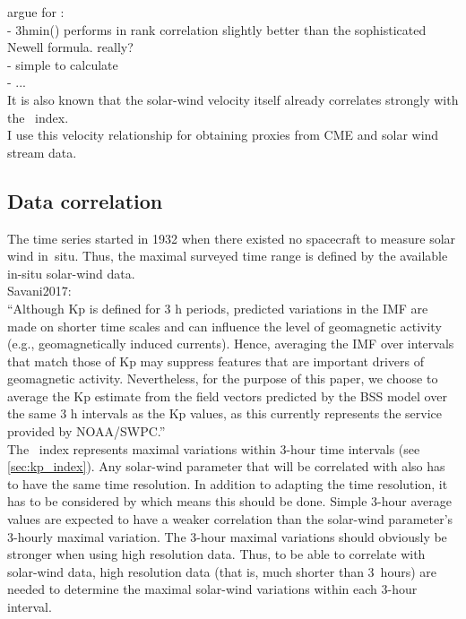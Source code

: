 argue for \vBz:\\
- 3hmin(\vBz) performs in rank correlation slightly better than the sophisticated Newell formula. really?\\
- simple to calculate\\
- ...\\

It is also known that the solar-wind velocity itself already correlates strongly with the \Kp~index.\\

I use this velocity relationship for obtaining \Kp{} proxies from CME and solar wind stream data.\\


\subsection{Data correlation}
\label{sec:data_correlation}
The \Kp{} time series started in 1932 when there existed no spacecraft to measure solar wind in~situ. Thus, the maximal surveyed time range is defined by the available in-situ solar-wind data.\\

Savani2017:\\
``Although Kp is defined for 3 h periods, predicted variations in the IMF are made on shorter time scales and can influence the level of geomagnetic activity (e.g., geomagnetically induced currents). Hence, averaging the IMF over intervals that match those of Kp may suppress features that are important drivers of geomagnetic activity. Nevertheless, for the purpose of this paper, we choose to average the Kp estimate from the field vectors predicted by the BSS model over the same 3 h intervals as the Kp values, as this currently represents the service provided by NOAA/SWPC.''\\

The \Kp{}~index represents maximal variations within 3-hour time intervals (see \autoref{sec:kp_index}). Any solar-wind parameter that will be correlated with \Kp{} also has to have the same time resolution. In addition to adapting the time resolution, it has to be considered by which means this should be done. Simple 3-hour average values are expected to have a weaker correlation than the solar-wind parameter's 3-hourly maximal variation.
The 3-hour maximal variations should obviously be stronger when using high resolution data. Thus, to be able to correlate \Kp{} with solar-wind data, high resolution data (that is, much shorter than 3~hours) are needed to determine the maximal solar-wind variations within each 3-hour interval.\\

